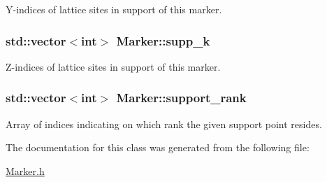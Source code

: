 Y-\/indices of lattice sites in support of this marker. 

\subsubsection[{\texorpdfstring{supp\+\_\+k}{supp_k}}]{\setlength{\rightskip}{0pt plus 5cm}std\+::vector$<$int$>$ Marker\+::supp\+\_\+k}\hypertarget{class_marker_ab06b6d2cfb7221579cf32538f0c79b82}{}\label{class_marker_ab06b6d2cfb7221579cf32538f0c79b82}


Z-\/indices of lattice sites in support of this marker. 

\subsubsection[{\texorpdfstring{support\+\_\+rank}{support_rank}}]{\setlength{\rightskip}{0pt plus 5cm}std\+::vector$<$int$>$ Marker\+::support\+\_\+rank}\hypertarget{class_marker_a183752ab41e56b159570a103c25f2aec}{}\label{class_marker_a183752ab41e56b159570a103c25f2aec}


Array of indices indicating on which rank the given support point resides. 



The documentation for this class was generated from the following file\+:\begin{DoxyCompactItemize}
\item 
\hyperlink{_marker_8h}{Marker.\+h}\end{DoxyCompactItemize}
